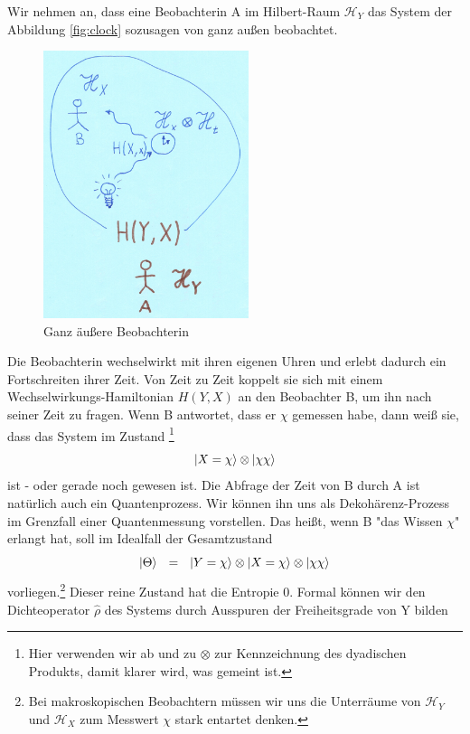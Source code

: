 \documentclass[12pt]{article}
\begin{document}
Wir nehmen an, dass eine Beobachterin A im Hilbert-Raum $\mathscr{H}_Y$ das System der Abbildung \ref{fig:clock} sozusagen von ganz außen beobachtet. 
\begin{figure}[!h]\begin{center}
  \includegraphics[width=6cm]{Entropie.png}
  \caption{Ganz äußere Beobachterin}
  \label{fig:entropy}
\end{center}\end{figure}
Die Beobachterin wechselwirkt mit ihren eigenen Uhren und erlebt dadurch ein Fortschreiten ihrer Zeit. Von Zeit zu Zeit koppelt sie sich mit einem Wechselwirkungs-Hamiltonian $H(Y,X)$ an den Beobachter B, um ihn nach seiner Zeit zu fragen. Wenn B antwortet, dass er $\chi$ gemessen habe, dann weiß sie, dass das System im Zustand \footnote{Hier verwenden wir ab und zu $\otimes$ zur Kennzeichnung des dyadischen Produkts, damit klarer wird, was gemeint ist.}
\begin{equation}
\ket{X=\chi}\otimes\ket{\chi\chi}
\end{equation}
ist - oder gerade noch gewesen ist. Die Abfrage der Zeit von B durch A ist natürlich auch ein Quantenprozess. Wir können ihn uns als Dekohärenz-Prozess im Grenzfall einer Quantenmessung vorstellen. Das heißt, wenn B "das Wissen $\chi$" erlangt hat, soll im Idealfall der Gesamtzustand
\begin{equation}
\ket{\Theta}\ \ =\ \ \ket{Y=\chi}\otimes\ket{X=\chi}\otimes\ket{\chi\chi}
\end{equation}
vorliegen.\footnote{Bei makroskopischen Beobachtern müssen wir uns die Unterräume von $\mathscr{H}_Y$ und $\mathscr{H}_X$ zum Messwert $\chi$ stark entartet denken.}  Dieser reine Zustand hat die Entropie 0. Formal können wir den Dichteoperator $\hat{\rho}$ des Systems durch Ausspuren der Freiheitsgrade von Y bilden
\end{document}

